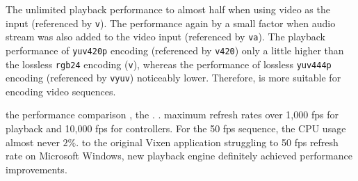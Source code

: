 The unlimited playback performance  to almost half when using  video as the input (referenced by \texttt{v}). The performance  again by a small factor when  audio stream was also added to the video input (referenced by \texttt{va}). The  playback performance of \texttt{yuv420p} encoding (referenced by \texttt{v420})  only a little higher than the lossless \texttt{rgb24} encoding (\texttt{v}), whereas the performance of lossless \texttt{yuv444p} encoding (referenced by \texttt{vyuv})  noticeably lower. Therefore,  is more suitable for encoding video sequences.

   the performance comparison ,  the . .  maximum refresh rates  over 1,000 fps for playback and 10,000 fps for controllers. For the 50 fps  sequence, the CPU usage almost never  $2 \%$.  to the original Vixen application struggling to  50 fps refresh rate on Microsoft Windows,  new playback engine definitely achieved  performance improvements.

